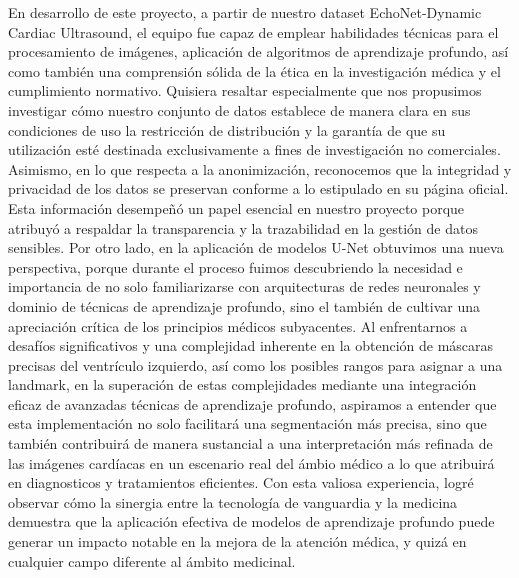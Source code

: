 \documentclass[runningheads]{llncs}
\begin{document}
En desarrollo de este proyecto, a partir de nuestro dataset EchoNet-Dynamic Cardiac Ultrasound, el equipo fue capaz de emplear habilidades técnicas para el procesamiento de imágenes, aplicación de algoritmos de aprendizaje profundo, así como también una comprensión sólida de la ética en la investigación médica y el cumplimiento normativo. Quisiera resaltar especialmente que nos propusimos investigar cómo nuestro conjunto de datos establece de manera clara en sus condiciones de uso la restricción de distribución y la garantía de que su utilización esté destinada exclusivamente a fines de investigación no comerciales. Asimismo, en lo que respecta a la anonimización, reconocemos que la integridad y privacidad de los datos se preservan conforme a lo estipulado en su página oficial. Esta información desempeñó un papel esencial en nuestro proyecto porque atribuyó a respaldar la transparencia y la trazabilidad en la gestión de datos sensibles. Por otro lado, en la aplicación de modelos U-Net obtuvimos una nueva perspectiva, porque durante el proceso fuimos descubriendo la necesidad e importancia de no solo familiarizarse con  arquitecturas de redes neuronales y dominio de técnicas de aprendizaje profundo, sino el también de cultivar una apreciación crítica de los principios médicos subyacentes. Al enfrentarnos a desafíos significativos y una complejidad inherente en la obtención de máscaras precisas del ventrículo izquierdo, así como los posibles rangos para asignar a una landmark, en la superación de estas complejidades mediante una integración eficaz de avanzadas técnicas de aprendizaje profundo, aspiramos a entender que esta implementación no solo facilitará una segmentación más precisa, sino que también contribuirá de manera sustancial a una interpretación más refinada de las imágenes cardíacas en un escenario real del ámbio médico a lo que atribuirá en diagnosticos y tratamientos eficientes. Con esta valiosa experiencia, logré observar cómo la sinergia entre la tecnología de vanguardia y la medicina demuestra que la aplicación efectiva de modelos de aprendizaje profundo puede generar un impacto notable en la mejora de la atención médica, y quizá en cualquier campo diferente al ámbito medicinal.
\vspace{5em} %
\end{document}
